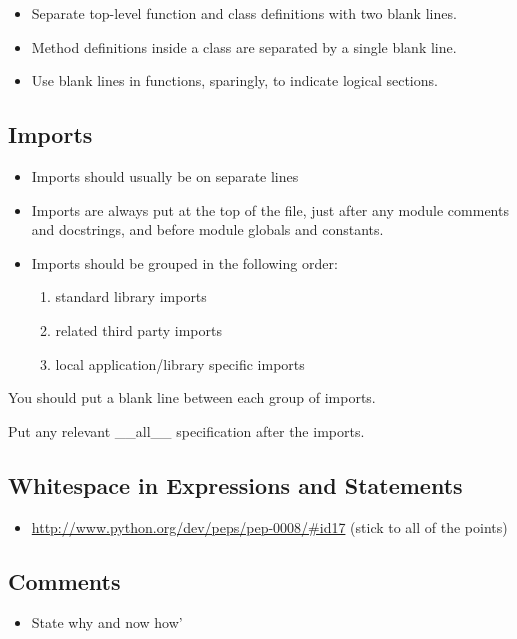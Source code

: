 \documentclass[11pt]{article}
\begin{document}
\begin{itemize}
\item Separate top-level function and class definitions with two blank lines.
\item Method definitions inside a class are separated by a single blank line.
\item Use blank lines in functions, sparingly, to indicate logical sections.
\end{itemize}
\subsection{Imports}
\label{sec-3-4}

\begin{itemize}
\item Imports should usually be on separate lines
\item Imports are always put at the top of the file, just after any module comments and docstrings, and before module globals and constants.
\item Imports should be grouped in the following order:
\begin{enumerate}
\item standard library imports
\item related third party imports
\item local application/library specific imports
\end{enumerate}
\end{itemize}
   You should put a blank line between each group of imports.

   Put any relevant \_\_all\_\_ specification after the imports.
\subsection{Whitespace in Expressions and Statements}
\label{sec-3-5}

\begin{itemize}
\item \href{http://www.python.org/dev/peps/pep-0008/#id17}{http://www.python.org/dev/peps/pep-0008/\#id17} (stick to all of the points)
\end{itemize}
\subsection{Comments}
\label{sec-3-6}

\begin{itemize}
\item State why and now how'
\end{itemize}
\end{document}
